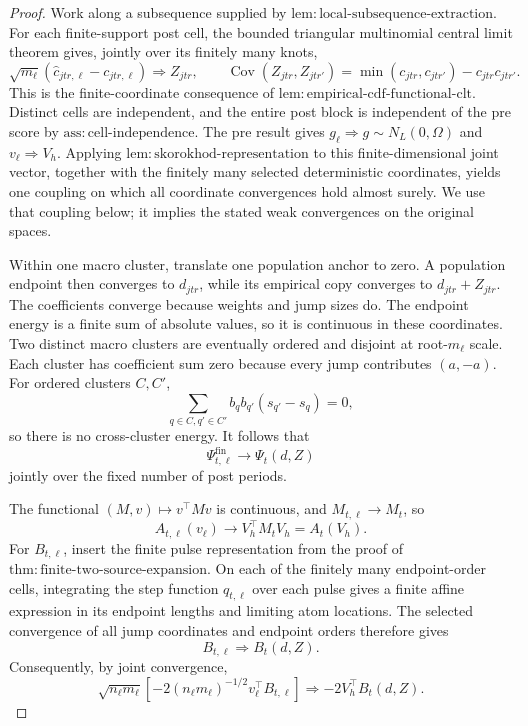 \documentclass{article}
\begin{document}
\begin{proof}
Work along a subsequence supplied by \(\mathrm{lem:local\mbox{-}subsequence\mbox{-}extraction}\).  For each finite-support post cell, the bounded triangular multinomial central limit theorem gives, jointly over its finitely many knots,
\[
 \sqrt{m_\ell}(\widehat c_{jtr,\ell}-c_{jtr,\ell})
 \Rightarrow Z_{jtr},
 \qquad
 \operatorname{Cov}(Z_{jtr},Z_{jtr'})
 =\min(c_{jtr},c_{jtr'})-c_{jtr}c_{jtr'}.
\]
This is the finite-coordinate consequence of
\(\mathrm{lem:empirical\mbox{-}cdf\mbox{-}functional\mbox{-}clt}\).  Distinct cells are independent, and the entire post block is independent of the pre score by \(\mathrm{ass:cell\mbox{-}independence}\).  The pre result gives \(g_\ell\Rightarrow g\sim N_L(0,\Omega)\) and \(v_\ell\Rightarrow V_h\).  Applying \(\mathrm{lem:skorokhod\mbox{-}representation}\) to this finite-dimensional joint vector, together with the finitely many selected deterministic coordinates, yields one coupling on which all coordinate convergences hold almost surely.  We use that coupling below; it implies the stated weak convergences on the original spaces.

Within one macro cluster, translate one population anchor to zero.  A population endpoint then converges to \(d_{jtr}\), while its empirical copy converges to \(d_{jtr}+Z_{jtr}\).  The coefficients converge because weights and jump sizes do.  The endpoint energy is a finite sum of absolute values, so it is continuous in these coordinates.  Two distinct macro clusters are eventually ordered and disjoint at root-\(m_\ell\) scale.  Each cluster has coefficient sum zero because every jump contributes \((a,-a)\).  For ordered clusters \(C,C'\),
\[
 \sum_{q\in C,q'\in C'}b_qb_{q'}(s_{q'}-s_q)=0,
\]
so there is no cross-cluster energy.  It follows that
\[
 \Psi^{\mathrm{fin}}_{t,\ell}\longrightarrow\Psi_t(d,Z)
\]
jointly over the fixed number of post periods.

The functional \((M,v)\mapsto v^\top Mv\) is continuous, and
\(M_{t,\ell}\to M_t\), so
\[
 A_{t,\ell}(v_\ell)\longrightarrow V_h^\top M_tV_h=A_t(V_h).
\]
For \(B_{t,\ell}\), insert the finite pulse representation from the proof of
\(\mathrm{thm:finite\mbox{-}two\mbox{-}source\mbox{-}expansion}\).  On each of the finitely many endpoint-order cells, integrating the step function \(q_{t,\ell}\) over each pulse gives a finite affine expression in its endpoint lengths and limiting atom locations.  The selected convergence of all jump coordinates and endpoint orders therefore gives
\[
 B_{t,\ell}\Rightarrow B_t(d,Z).
\]
Consequently, by joint convergence,
\[
 \sqrt{n_\ell m_\ell}\left[-2(n_\ell m_\ell)^{-1/2}
 v_\ell^\top B_{t,\ell}\right]
 \Rightarrow-2V_h^\top B_t(d,Z).
\]


\end{proof}
\end{document}
